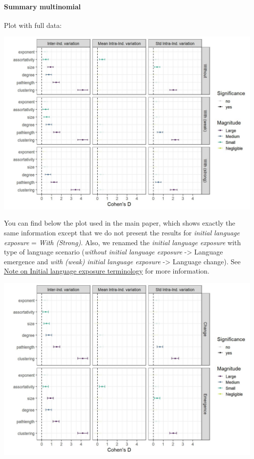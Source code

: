 \documentclass[
]{article}
\begin{document}
\hypertarget{summary-multinomial}{%
\paragraph{Summary multinomial}\label{summary-multinomial}}

Plot with full data:

\begin{center}\includegraphics{./Figures/unnamed-chunk-35-1} \end{center}

You can find below the plot used in the main paper, which shows exactly
the same information except that we do not present the results for
\emph{initial language exposure} = \emph{With (Strong)}. Also, we
renamed the \emph{initial language exposure} with type of language
scenario (\emph{without initial language exposure} -\textgreater{}
Language emergence and \emph{with (weak) initial language exposure}
-\textgreater{} Language change). See
\protect\hyperlink{note-on-initial-language-exposure-terminology}{Note
on Initial language exposure terminology} for more information.

\begin{center}\includegraphics{./Figures/unnamed-chunk-36-1} \end{center}
\end{document}
